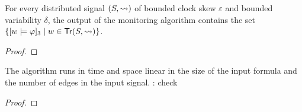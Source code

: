 \begin{claim}
	For every distributed signal $(S, {\rightsquigarrow})$ of bounded clock skew $\varepsilon$ and bounded variability $\delta$, the output of the monitoring algorithm contains the set $\{ [w \models \varphi]_3 \st w \in \tr(S, {\hb}) \}$.
\end{claim}
\begin{proof}
	\TODO
\end{proof}

\begin{claim}
	The algorithm runs in time and space linear in the size of the input formula and the number of edges in the input signal. \TODO: check
\end{claim}
\begin{proof}
	\TODO %
\end{proof}